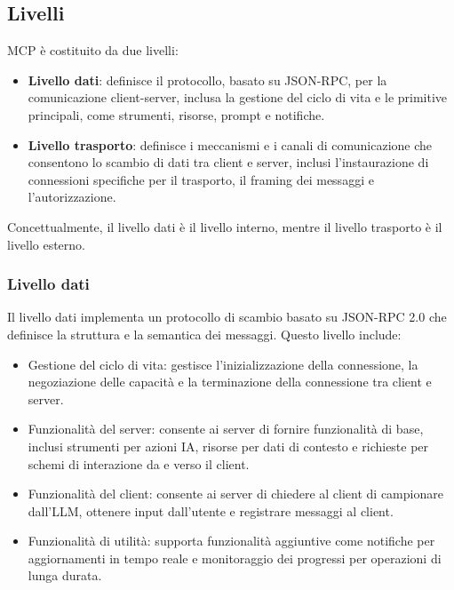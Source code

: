 \subsection{Livelli}
MCP è costituito da due livelli:
\begin{itemize}
\item \textbf{Livello dati}: definisce il protocollo, basato su JSON-RPC, per la comunicazione client-server, inclusa la gestione del ciclo di vita e le primitive principali, come strumenti, risorse, prompt e notifiche.
\item \textbf{Livello trasporto}: definisce i meccanismi e i canali di comunicazione che consentono lo scambio di dati tra client e server, inclusi l'instaurazione di connessioni specifiche per il trasporto, il framing dei messaggi e l'autorizzazione.
\end{itemize}
Concettualmente, il livello dati è il livello interno, mentre il livello trasporto è il livello esterno.
\cite{modelcontextprotocol2024arch}

\subsubsection{Livello dati}
Il livello dati implementa un protocollo di scambio basato su JSON-RPC 2.0 che definisce la struttura e la semantica dei messaggi. Questo livello include:
\begin{itemize}
\item Gestione del ciclo di vita: gestisce l'inizializzazione della connessione, la negoziazione delle capacità e la terminazione della connessione tra client e server.
\item Funzionalità del server: consente ai server di fornire funzionalità di base, inclusi strumenti per azioni IA, risorse per dati di contesto e richieste per schemi di interazione da e verso il client.
\item Funzionalità del client: consente ai server di chiedere al client di campionare dall'LLM, ottenere input dall'utente e registrare messaggi al client.
\item Funzionalità di utilità: supporta funzionalità aggiuntive come notifiche per aggiornamenti in tempo reale e monitoraggio dei progressi per operazioni di lunga durata.
\cite{modelcontextprotocol2024arch}
\end{itemize}

